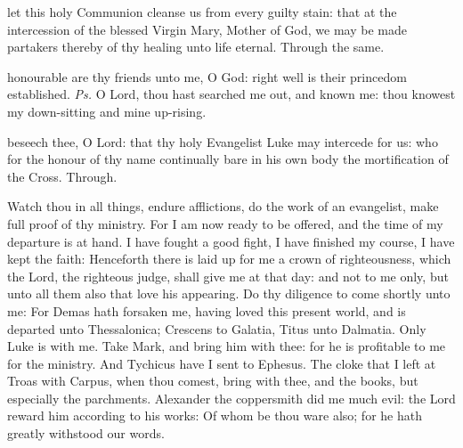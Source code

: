 \postcommunion

\vspace{-0.1\baselineskip}

 let this holy Communion cleanse us from every guilty stain: that at the intercession of the blessed Virgin Mary, Mother of God, we may be made partakers thereby of thy healing unto life eternal. Through the same.


\vspace{-0.2\baselineskip}

\introit

\vspace{-0.1\baselineskip}

 honourable are thy friends unto me, O God: right well is their princedom established. \textit{Ps.} O Lord, thou hast searched me out, and known me: thou knowest my down-sitting and mine up-rising.

\vspace{-0.2\baselineskip}

\collect

\vspace{-0.1\baselineskip}

 beseech thee, O Lord: that thy holy Evangelist Luke may intercede for us: who for the honour of thy name continually bare in his own body the mortification of the Cross. Through.

\vspace{-0.2\baselineskip}


\vspace{-0.1\baselineskip}

 Watch thou in all things, endure afflictions, do the work of an evangelist, make full proof of thy ministry. For I am now ready to be offered, and the time of my departure is at hand. I have fought a good fight, I have finished my course, I have kept the faith: Henceforth there is laid up for me a crown of righteousness, which the Lord, the righteous judge, shall give me at that day: and not to me only, but unto all them also that love his appearing. Do thy diligence to come shortly unto me: For Demas hath forsaken me, having loved this present world, and is departed unto Thessalonica; Crescens to Galatia, Titus unto Dalmatia. Only Luke is with me. Take Mark, and bring him with thee: for he is profitable to me for the ministry. And Tychicus have I sent to Ephesus. The cloke that I left at Troas with Carpus, when thou comest, bring with thee, and the books, but especially the parchments. Alexander the coppersmith did me much evil: the Lord reward him according to his works: Of whom be thou ware also; for he hath greatly withstood our words.

